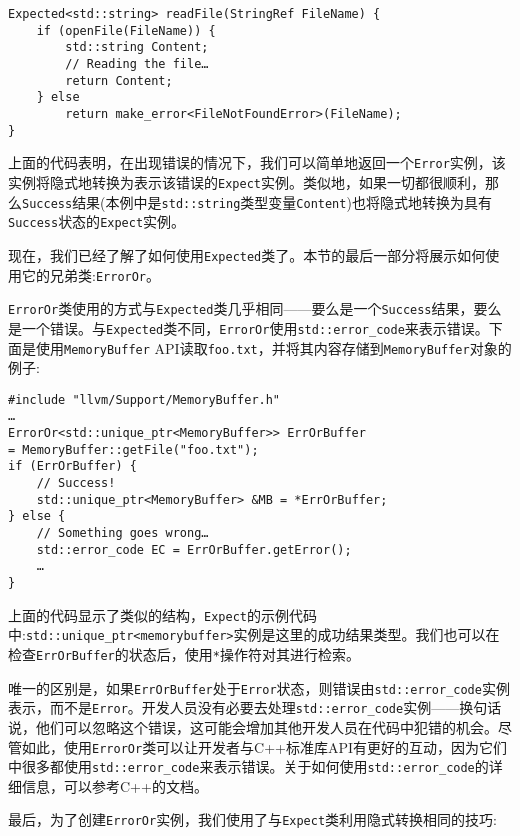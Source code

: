 \begin{lstlisting}[style=styleCXX]
Expected<std::string> readFile(StringRef FileName) {
	if (openFile(FileName)) {
		std::string Content;
		// Reading the file…
		return Content;
	} else
		return make_error<FileNotFoundError>(FileName);
}
\end{lstlisting}

上面的代码表明，在出现错误的情况下，我们可以简单地返回一个\texttt{Error}实例，该实例将隐式地转换为表示该错误的\texttt{Expect}实例。类似地，如果一切都很顺利，那么\texttt{Success}结果(本例中是\texttt{std::string}类型变量\texttt{Content})也将隐式地转换为具有\texttt{Success}状态的\texttt{Expect}实例。

现在，我们已经了解了如何使用\texttt{Expected}类了。本节的最后一部分将展示如何使用它的兄弟类:\texttt{ErrorOr}。


\texttt{ErrorOr}类使用的方式与\texttt{Expected}类几乎相同——要么是一个\texttt{Success}结果，要么是一个错误。与\texttt{Expected}类不同，\texttt{ErrorOr}使用\texttt{std::error\_code}来表示错误。下面是使用\texttt{MemoryBuffer} API读取\texttt{foo.txt}，并将其内容存储到\texttt{MemoryBuffer}对象的例子:

\begin{lstlisting}[style=styleCXX]
#include "llvm/Support/MemoryBuffer.h"
…
ErrorOr<std::unique_ptr<MemoryBuffer>> ErrOrBuffer
= MemoryBuffer::getFile("foo.txt");
if (ErrOrBuffer) {
	// Success!
	std::unique_ptr<MemoryBuffer> &MB = *ErrOrBuffer;
} else {
	// Something goes wrong…
	std::error_code EC = ErrOrBuffer.getError();
	…
}
\end{lstlisting}

上面的代码显示了类似的结构，\texttt{Expect}的示例代码中:\texttt{std::unique\_ptr<memorybuffer>}实例是这里的成功结果类型。我们也可以在检查\texttt{ErrOrBuffer}的状态后，使用\texttt{*}操作符对其进行检索。

唯一的区别是，如果\texttt{ErrOrBuffer}处于\texttt{Error}状态，则错误由\texttt{std::error\_code}实例表示，而不是\texttt{Error}。开发人员没有必要去处理\texttt{std::error\_code}实例——换句话说，他们可以忽略这个错误，这可能会增加其他开发人员在代码中犯错的机会。尽管如此，使用\texttt{ErrorOr}类可以让开发者与C++标准库API有更好的互动，因为它们中很多都使用\texttt{std::error\_code}来表示错误。关于如何使用\texttt{std::error\_code}的详细信息，可以参考C++的文档。

最后，为了创建\texttt{ErrorOr}实例，我们使用了与\texttt{Expect}类利用隐式转换相同的技巧:

